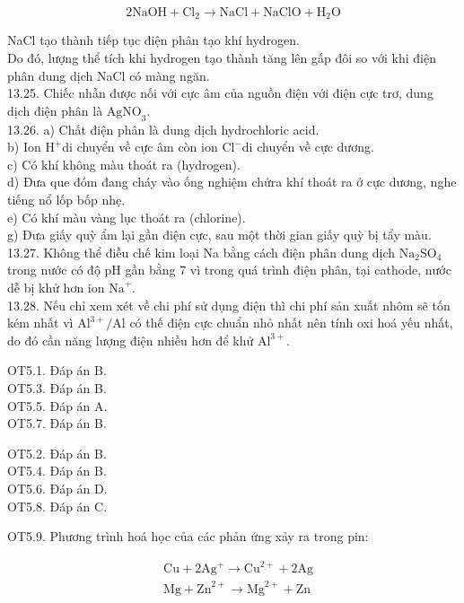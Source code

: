 \documentclass[10pt]{article}
\begin{document}
$$
2 \mathrm{NaOH}+\mathrm{Cl}_{2} \rightarrow \mathrm{NaCl}+\mathrm{NaClO}+\mathrm{H}_{2} \mathrm{O}
$$

NaCl tạo thành tiếp tục điện phân tạo khí hydrogen.\\
Do đó, lượng thể tích khi hydrogen tạo thành tăng lên gấp đôi so với khi điện phân dung dịch NaCl có màng ngăn.\\
13.25. Chiếc nhẫn được nối với cực âm của nguồn điện với điện cực trơ, dung dịch điện phân là $\mathrm{AgNO}_{3}$.\\
13.26. a) Chất điện phân là dung dịch hydrochloric acid.\\
b) Ion $\mathrm{H}^{+}$di chuyển về cực âm còn ion $\mathrm{Cl}^{-}$di chuyển về cực dương.\\
c) Có khí không màu thoát ra (hydrogen).\\
d) Đưa que đóm đang cháy vào ống nghiệm chứra khí thoát ra ở cực dương, nghe tiếng nổ lốp bốp nhẹ.\\
e) Có khí màu vàng lục thoát ra (chlorine).\\
g) Đưa giấy quỳ ẩm lại gần điện cực, sau một thời gian giấy quỳ bị tẩy màu.\\
13.27. Không thể điều chế kim loại Na bằng cách điện phân dung dịch $\mathrm{Na}_{2} \mathrm{SO}_{4}$ trong nước có độ pH gần bằng 7 vì trong quá trình điện phân, tại cathode, nước dễ bị khử hơn ion $\mathrm{Na}^{+}$.\\
13.28. Nếu chỉ xem xét về chi phí sử dụng điện thì chi phí sản xuất nhôm sẽ tốn kém nhất vì $\mathrm{Al}^{3+} / \mathrm{Al}$ có thế điện cực chuẩn nhỏ nhất nên tính oxi hoá yếu nhất, do đó cần năng lượng điện nhiều hơn để khử $\mathrm{Al}^{3+}$.

OT5.1. Đáp án B.\\
OT5.3. Đáp án B.\\
OT5.5. Đáp án A.\\
OT5.7. Đáp án B.

OT5.2. Đáp án B.\\
OT5.4. Đáp án B.\\
OT5.6. Đáp án D.\\
OT5.8. Đáp án C.

OT5.9. Phương trình hoá học của các phản ứng xảy ra trong pin:

$$
\begin{aligned}
& \mathrm{Cu}+2 \mathrm{Ag}^{+} \rightarrow \mathrm{Cu}^{2+}+2 \mathrm{Ag} \\
& \mathrm{Mg}+\mathrm{Zn}^{2+} \rightarrow \mathrm{Mg}^{2+}+\mathrm{Zn}
\end{aligned}
$$
\end{document}
